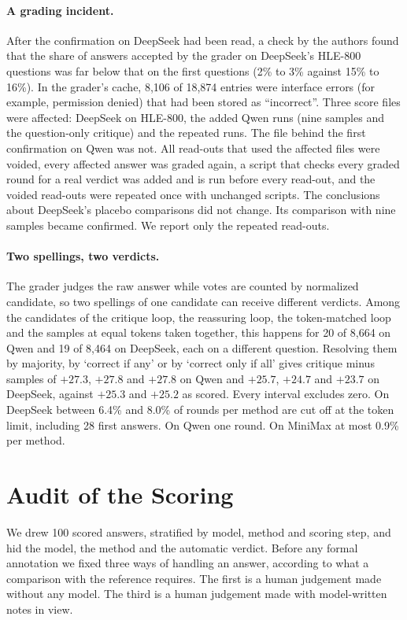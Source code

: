 \documentclass[11pt]{article}
\newcommand{\ds}{DeepSeek}
\newcommand{\qw}{Qwen}
\newcommand{\mm}{MiniMax}
\begin{document}
\paragraph{A grading incident.}
After the confirmation on \ds{} had been read, a check by the authors found that the share of answers accepted by the grader on \ds's HLE-800 questions was far below that on the first questions (2\% to 3\% against 15\% to 16\%). In the grader's cache, 8{,}106 of 18{,}874 entries were interface errors (for example, permission denied) that had been stored as ``incorrect''. Three score files were affected: \ds{} on HLE-800, the added \qw{} runs (nine samples and the question-only critique) and the repeated runs. The file behind the first confirmation on \qw{} was not. All read-outs that used the affected files were voided, every affected answer was graded again, a script that checks every graded round for a real verdict was added and is run before every read-out, and the voided read-outs were repeated once with unchanged scripts. The conclusions about \ds's placebo comparisons did not change. Its comparison with nine samples became confirmed. We report only the repeated read-outs.

\paragraph{Two spellings, two verdicts.}
The grader judges the raw answer while votes are counted by normalized candidate, so two spellings of one candidate can receive different verdicts. Among the candidates of the critique loop, the reassuring loop, the token-matched loop and the samples at equal tokens taken together, this happens for 20 of 8{,}664 on \qw{} and 19 of 8{,}464 on \ds, each on a different question. Resolving them by majority, by `correct if any' or by `correct only if all' gives critique minus samples of $+27.3$, $+27.8$ and $+27.8$ on \qw{} and $+25.7$, $+24.7$ and $+23.7$ on \ds, against $+25.3$ and $+25.2$ as scored. Every interval excludes zero.
On \ds{} between 6.4\% and 8.0\% of rounds per method are cut off at the token limit, including 28 first answers. On \qw{} one round. On \mm{} at most 0.9\% per method.

\section{Audit of the Scoring}
\label{app:audit}

We drew 100 scored answers, stratified by model, method and scoring step, and hid the model, the method and the automatic verdict.
Before any formal annotation we fixed three ways of handling an answer, according to what a comparison with the reference requires.
The first is a human judgement made without any model. The third is a human judgement made with model-written notes in view.
\end{document}
